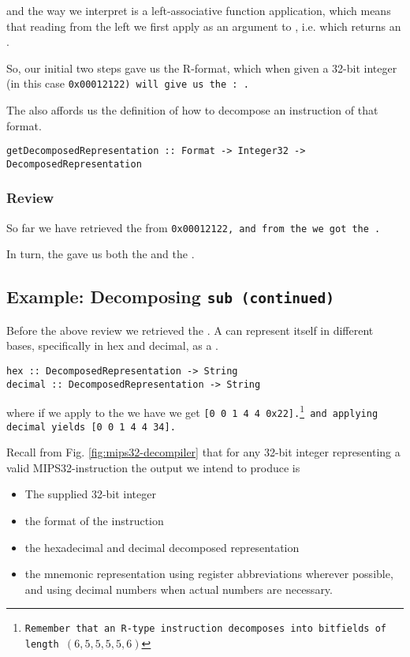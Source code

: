 and the way we interpret is a left-associative function application, which
means that reading from the left we first apply \integer as an argument
to \formatm, i.e.  which returns an \inamem.

So, our initial two steps gave us the R-format, which when given a
32-bit integer (in this case \tt{0x00012122}) will give us
the \inamem: .

The \formatm also affords us the definition of how to decompose an
instruction of that format.

\begin{verbatim}
getDecomposedRepresentation :: Format -> Integer32 -> DecomposedRepresentation
\end{verbatim}

\subsubsection{Review}

So far we have retrieved the \opcodem from \tt{0x00012122}, and from the
\opcodem we got the \formatm.

In turn, the \formatm gave us both the \decomposedm and the \inamem.

\subsection{Example: Decomposing \tt{sub} (continued)}

Before the above review we retrieved the \decomposedm. A \decomposedm
can represent itself in different bases, specifically in hex and decimal,
as a .

\begin{verbatim}
hex :: DecomposedRepresentation -> String
decimal :: DecomposedRepresentation -> String
\end{verbatim}

where if we apply  to the \decomposedm we have
we get \tt{[0 0 1 4 4 0x22]}.\footnote{Remember that an R-type instruction
decomposes into bitfields of length $(6, 5, 5, 5, 5, 6)$} and applying
\texttt{decimal} yields \tt{[0 0 1 4 4 34]}.

Recall from Fig. \ref{fig:mips32-decompiler} that for any 32-bit integer
representing a valid MIPS32-instruction the output we intend to produce is

\begin{itemize}
  \item The supplied 32-bit integer
  \item the format of the instruction
  \item the hexadecimal and decimal decomposed representation
  \item the mnemonic representation using register
          abbreviations wherever possible, and using decimal numbers
          when actual numbers are necessary.
\end{itemize}

